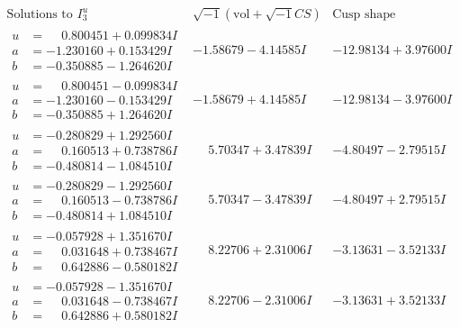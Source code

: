 \documentclass[1p]{elsarticle_modified}
\theoremstyle{definition}
\newcommand{\I}{\sqrt{-1}}
\begin{document}
$$\begin{array}{c|c|c}  
\text{Solutions to }I^u_{3}& \I (\text{vol} + \sqrt{-1}CS) & \text{Cusp shape}\\
 \hline 
\begin{aligned}
u &= \phantom{-}0.800451 + 0.099834 I \\
a &= -1.230160 + 0.153429 I \\
b &= -0.350885 - 1.264620 I\end{aligned}
 & -1.58679 - 4.14585 I & -12.98134 + 3.97600 I \\ \hline\begin{aligned}
u &= \phantom{-}0.800451 - 0.099834 I \\
a &= -1.230160 - 0.153429 I \\
b &= -0.350885 + 1.264620 I\end{aligned}
 & -1.58679 + 4.14585 I & -12.98134 - 3.97600 I \\ \hline\begin{aligned}
u &= -0.280829 + 1.292560 I \\
a &= \phantom{-}0.160513 + 0.738786 I \\
b &= -0.480814 - 1.084510 I\end{aligned}
 & \phantom{-}5.70347 + 3.47839 I & -4.80497 - 2.79515 I \\ \hline\begin{aligned}
u &= -0.280829 - 1.292560 I \\
a &= \phantom{-}0.160513 - 0.738786 I \\
b &= -0.480814 + 1.084510 I\end{aligned}
 & \phantom{-}5.70347 - 3.47839 I & -4.80497 + 2.79515 I \\ \hline\begin{aligned}
u &= -0.057928 + 1.351670 I \\
a &= \phantom{-}0.031648 + 0.738467 I \\
b &= \phantom{-}0.642886 - 0.580182 I\end{aligned}
 & \phantom{-}8.22706 + 2.31006 I & -3.13631 - 3.52133 I \\ \hline\begin{aligned}
u &= -0.057928 - 1.351670 I \\
a &= \phantom{-}0.031648 - 0.738467 I \\
b &= \phantom{-}0.642886 + 0.580182 I\end{aligned}
 & \phantom{-}8.22706 - 2.31006 I & -3.13631 + 3.52133 I \\ \hline\begin{aligned}

\end{aligned}
\end{array}$$
\end{document}
